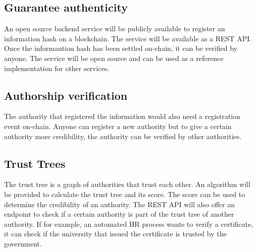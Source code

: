 \documentclass[../ockr-specification.tex]{subfiles}
\begin{document}
\subsection{Guarantee authenticity}

An open source backend service will be publicly available to register an information hash on a blockchain. The service will be available as a REST API. Once the informantion hash has been settled on-chain, it can be verified by anyone. The service will be open source and can be used as a reference implementation for other services.

\subsection{Authorship verification}

The authority that registered the information would also need a registration event on-chain. Anyone can register a new authority but to give a certain authority more credibility, the authority can be verified by other authorities.

\subsection{Trust Trees}

The trust tree is a graph of authorities that trust each other. An algorithm will be provided to calculate the trust tree and its score. The score can be used to determine the credibility of an authority. The REST API will also offer an endpoint to check if a certain authority is part of the trust tree of another authority. If for example, an automated HR process wants to verify a certificate, it can check if the university that issued the certificate is trusted by the government.
\end{document}
